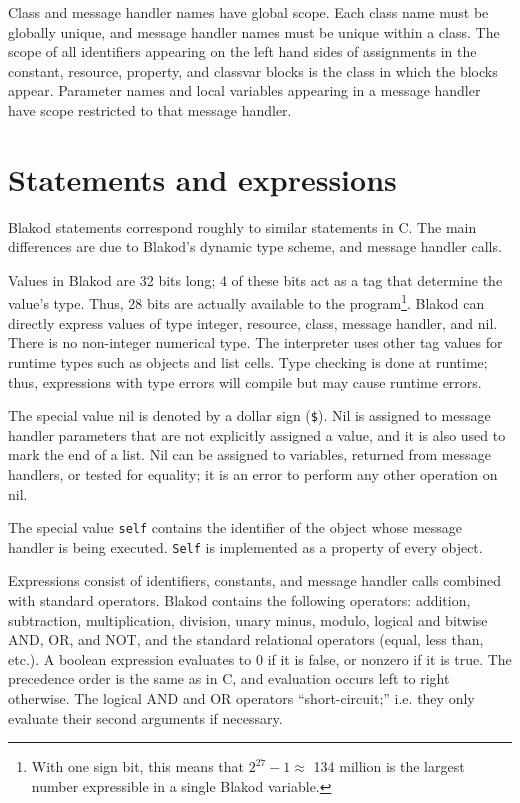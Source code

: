 \documentclass[12pt]{article}
\begin{document}
Class and message handler names have global scope. Each class name
must be globally unique, and message handler names must be unique
within a class.  The scope of all identifiers appearing on the left
hand sides of assignments in the constant, resource, property, and
classvar blocks is the class in which the blocks appear.  Parameter
names and local variables appearing in a message handler have scope
restricted to that message handler.



\section{Statements and expressions}

Blakod statements correspond roughly to similar statements in C.  The
main differences are due to Blakod's dynamic type scheme, and message
handler calls.

Values in Blakod are 32 bits long; 4 of these bits act as a tag that
determine the value's type.  Thus, 28 bits are actually available to
the program\footnote{With one sign bit, this means that $2^{27} - 1
\approx $
134 million is the largest number expressible in a single Blakod
variable.}.  Blakod can directly express values of type integer,
resource, class, message handler, and nil.  There is no non-integer
numerical type.  The interpreter uses other tag values for runtime
types such as objects and list cells.  Type checking is done at
runtime; thus, expressions with type errors will compile but may cause
runtime errors.

The special value nil is denoted by a dollar sign ({\tt \$}).  Nil is
assigned to message handler parameters that are not explicitly
assigned a value, and it is also used to mark the end of a list.  Nil
can be assigned to variables, returned from message handlers, or
tested for equality; it is an error to perform any other operation on
nil.

The special value {\tt self} contains the identifier of the object
whose message handler is being executed.  {\tt Self} is implemented as a
property of every object.

Expressions consist of identifiers, constants, and message handler
calls combined with standard operators.  Blakod contains the following
operators: addition, subtraction, multiplication, division, unary
minus, modulo, logical and bitwise AND, OR, and NOT, and the standard
relational operators (equal, less than, etc.).  A boolean expression
evaluates to 0 if it is false, or nonzero if it is true.  The
precedence order is the same as in C, and evaluation occurs left to
right otherwise.  The logical AND and OR operators ``short-circuit;''
i.e. they only evaluate their second arguments if necessary.
\end{document}
